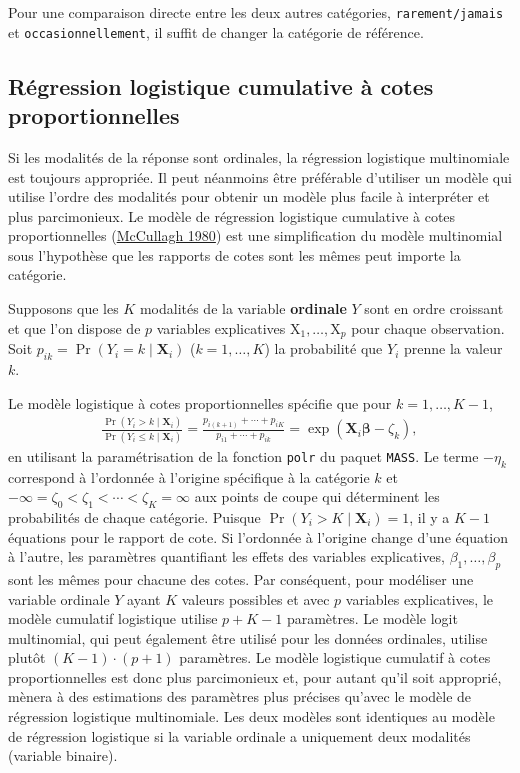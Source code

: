 \documentclass[
  11pt,
  letterpaper,
]{scrbook}
\theoremstyle{definition}
\theoremstyle{remark}
\begin{document}
Pour une comparaison directe entre les deux autres catégories,
\texttt{rarement/jamais} et \texttt{occasionnellement}, il suffit de
changer la catégorie de référence.

\hypertarget{ruxe9gression-logistique-cumulative-uxe0-cotes-proportionnelles}{%
\subsection{Régression logistique cumulative à cotes
proportionnelles}\label{ruxe9gression-logistique-cumulative-uxe0-cotes-proportionnelles}}

Si les modalités de la réponse sont ordinales, la régression logistique
multinomiale est toujours appropriée. Il peut néanmoins être préférable
d'utiliser un modèle qui utilise l'ordre des modalités pour obtenir un
modèle plus facile à interpréter et plus parcimonieux. Le modèle de
régression logistique cumulative à cotes proportionnelles
(\protect\hyperlink{ref-McCullagh:1980}{McCullagh 1980}) est une
simplification du modèle multinomial sous l'hypothèse que les rapports
de cotes sont les mêmes peut importe la catégorie.

Supposons que les \(K\) modalités de la variable \textbf{ordinale} \(Y\)
sont en ordre croissant et que l'on dispose de \(p\) variables
explicatives \(\mathrm{X}_1, \ldots, \mathrm{X}_p\) pour chaque
observation. Soit \(p_{ik}=\Pr(Y_i=k \mid \mathbf{X}_{i})\)
(\(k=1, \ldots, K\)) la probabilité que \(Y_{i}\) prenne la valeur
\(k\).

Le modèle logistique à cotes proportionnelles spécifie que pour
\(k=1, \ldots, K-1\), \begin{align*}
\frac{\Pr(Y_i > k \mid \mathbf{X}_i)}{\Pr(Y_i \leq k \mid \mathbf{X}_i)} = \frac{p_{i(k+1)} + \cdots + p_{iK}}{p_{i1} + \cdots + p_{ik}} = \exp(\mathbf{X}_i \boldsymbol{\beta} - \zeta_k),
\end{align*} en utilisant la paramétrisation de la fonction
\texttt{polr} du paquet \texttt{MASS}. Le terme \(-\eta_{k}\) correspond
à l'ordonnée à l'origine spécifique à la catégorie \(k\) et
\(-\infty=\zeta_0 < \zeta_1 < \cdots < \zeta_K =\infty\) aux points de
coupe qui déterminent les probabilités de chaque catégorie. Puisque
\(\Pr(Y_i > K \mid \mathbf{X}_i)=1\), il y a \(K-1\) équations pour le
rapport de cote. Si l'ordonnée à l'origine change d'une équation à
l'autre, les paramètres quantifiant les effets des variables
explicatives, \(\beta_1, \ldots, \beta_p\) sont les mêmes pour chacune
des cotes. Par conséquent, pour modéliser une variable ordinale \(Y\)
ayant \(K\) valeurs possibles et avec \(p\) variables explicatives, le
modèle cumulatif logistique utilise \(p + K - 1\) paramètres. Le modèle
logit multinomial, qui peut également être utilisé pour les données
ordinales, utilise plutôt \((K-1) \cdot(p+1)\) paramètres. Le modèle
logistique cumulatif à cotes proportionnelles est donc plus parcimonieux
et, pour autant qu'il soit approprié, mènera à des estimations des
paramètres plus précises qu'avec le modèle de régression logistique
multinomiale. Les deux modèles sont identiques au modèle de régression
logistique si la variable ordinale a uniquement deux modalités (variable
binaire).
\end{document}
